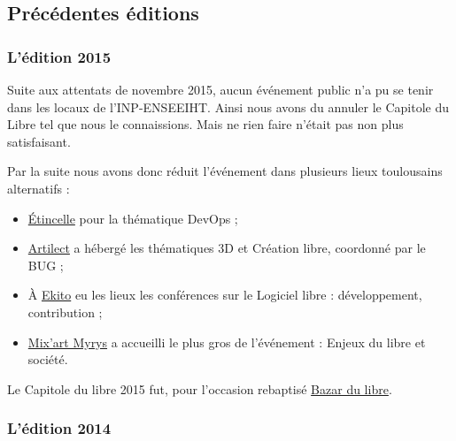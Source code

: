 \subsection{Précédentes éditions}

\subsubsection{L'édition 2015}

\label{ed2015}

Suite aux attentats de novembre 2015, aucun événement public n'a pu se tenir dans les locaux de l'INP-ENSEEIHT. Ainsi nous avons du annuler le Capitole du Libre tel que nous le connaissions. Mais ne rien faire n'était pas non plus satisfaisant. 

Par la suite nous avons donc réduit l'événement dans plusieurs lieux toulousains alternatifs :

\begin{itemize}[label=$\bullet$]
\item  \href{http://www.coworking-toulouse.com}{Étincelle} pour la thématique DevOps ;
\item  \href{http://www.artilect.fr}{Artilect} a hébergé les thématiques 3D et Création libre, coordonné par le BUG ;
\item À \href{https://www.ekito.fr}{Ekito} eu les lieux les conférences sur le Logiciel libre : développement, contribution ;
\item \href{http://mixart-myrys.org/le-lieu/}{Mix'art Myrys} a accueilli le plus gros de l'événement : Enjeux du libre et société.
\end{itemize}

Le Capitole du libre 2015 fut, pour l'occasion rebaptisé \href{http://bazardulibre.org}{Bazar du libre}.



\subsubsection{L'édition 2014}

